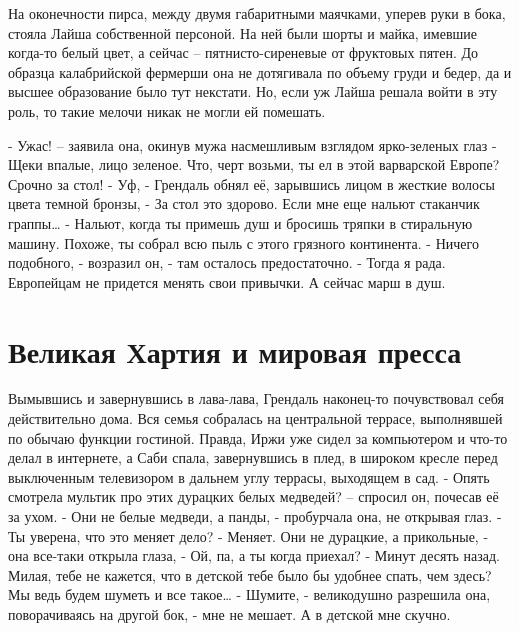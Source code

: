 \documentclass[10pt,final]{book}
\begin{document}
На оконечности пирса, между двумя габаритными маячками, уперев руки в бока, стояла Лайша собственной персоной. На ней были шорты и майка, имевшие когда-то белый цвет, а сейчас -- пятнисто-сиреневые от фруктовых пятен. До образца калабрийской фермерши она не дотягивала по объему груди и бедер, да и высшее образование было тут некстати. Но, если уж Лайша решала войти в эту роль, то такие мелочи никак не могли ей помешать.

- Ужас! -- заявила она, окинув мужа насмешливым взглядом ярко-зеленых глаз - Щеки впалые, лицо зеленое. Что, черт возьми, ты ел в этой варварской Европе? Срочно за стол!
- Уф, - Грендаль обнял её, зарывшись лицом в жесткие волосы цвета темной бронзы, - За стол это здорово. Если мне еще нальют стаканчик граппы\ldots{}
- Нальют, когда ты примешь душ и бросишь тряпки в стиральную машину. Похоже, ты собрал всю пыль с этого грязного континента.
- Ничего подобного, - возразил он, - там осталось предостаточно.
- Тогда я рада. Европейцам не придется менять свои привычки. А сейчас марш в душ.



\chapter{Великая Хартия и мировая пресса}


Вымывшись и завернувшись в лава-лава, Грендаль наконец-то почувствовал себя действительно дома. Вся семья собралась на центральной террасе, выполнявшей по обычаю функции гостиной. Правда, Иржи уже сидел за компьютером и что-то делал в интернете, а Саби спала, завернувшись в плед, в широком кресле перед выключенным телевизором в дальнем углу террасы, выходящем в сад.
- Опять смотрела мультик про этих дурацких белых медведей? -- спросил он, почесав её за ухом.
- Они не белые медведи, а панды, - пробурчала она, не открывая глаз.
- Ты уверена, что это меняет дело?
- Меняет. Они не дурацкие, а прикольные, - она все-таки открыла глаза, - Ой, па, а ты когда приехал?
- Минут десять назад. Милая, тебе не кажется, что в детской тебе было бы удобнее спать, чем здесь? Мы ведь будем шуметь и все такое\ldots{}
- Шумите, - великодушно разрешила она, поворачиваясь на другой бок, - мне не мешает. А в детской мне скучно.
\end{document}
